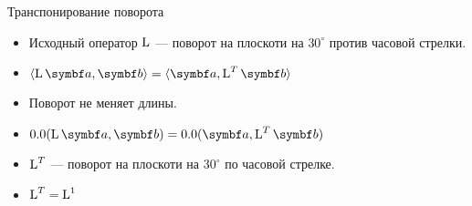\begin{frame}{Транспонирование поворота}


\begin{itemize}[<+->]
    \item 
Исходный оператор $\operatorname{L}$ — поворот на плоскоти на $30^{\circ}$ против часовой стрелки.

\item $\langle \LL \ba , \bb \rangle = \langle \ba , \LL^T \bb \rangle$

\item Поворот не меняет длины. 

\item $\angle (\LL \ba , \bb ) = \angle (\ba , \LL^T \bb)$

\item $\operatorname{L}^T$  — поворот на плоскоти на $30^{\circ}$ по часовой стрелке.

\item $\operatorname{L}^T=\operatorname{L}^{1}$

\end{itemize}

\end{frame}
    


